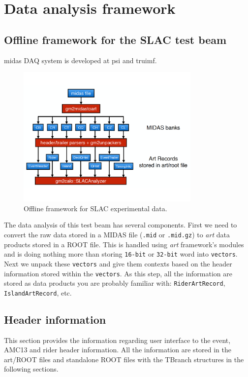 \chapter{Data analysis framework}
\label{chap:artframework}

\section{Offline framework for the SLAC test beam}

\ac{midas} DAQ system is developed at \ac{psi} and \ac{truimf}.

\begin{figure}[htbp]
\centering
\includegraphics[width=0.8\textwidth]{pics/offline_slac_framework}
\caption{Offline framework for SLAC experimental data.}
\end{figure}

The data analysis of this test beam has several components. First we need to convert the raw data stored in a MIDAS file (\verb+.mid+ or \verb+.mid.gz+) to \textit{art} data products stored in a ROOT file.
This is handled using \textit{art} framework's modules and is doing nothing more than storing \verb+16-bit+ or \verb+32-bit+ word into \verb+vectors+. Next we unpack these \verb+vectors+
and give them contexts based on the header information stored within the \verb+vectors+. As this step, all the information are stored as data products you are probably familiar with: \verb+RiderArtRecord+,
 \verb+IslandArtRecord+, etc.

\section{Header information}
This section provides the information regarding user interface to the event, AMC13 and rider header information. All the information are stored in the art/ROOT files and standalone ROOT files with the TBranch structures in the following sections.

